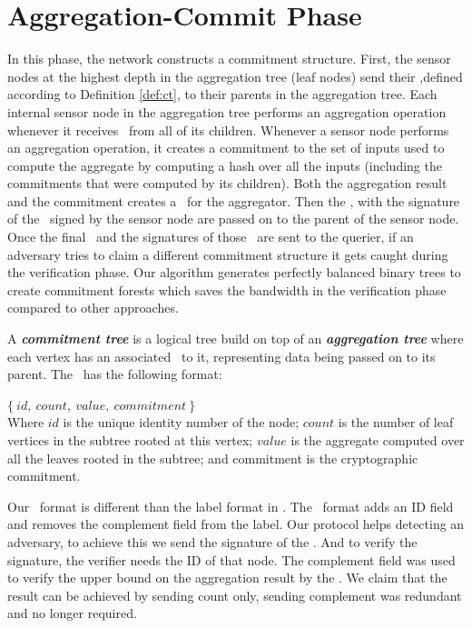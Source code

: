 \section{Aggregation-Commit Phase}
	In this phase, the network constructs a commitment structure. 
	First, the sensor nodes at the highest depth in the aggregation tree (leaf nodes) send their \payloads,defined according to Definition \ref{def:ct}, to their parents in the aggregation tree.
	Each internal sensor node in the aggregation tree performs an aggregation operation whenever it receives \payloads\  from all of its children.
	Whenever a sensor node performs an aggregation operation, it creates a commitment to the set of inputs used to compute the aggregate by computing a hash over all the inputs (including the commitments that were computed by its children). 
	Both the aggregation result and the commitment creates a \payload\ for the aggregator.
	Then the \payload, with the signature of the \payload\ signed by the sensor node are passed on to the parent of the sensor node.
	Once the final \payloads\  and the signatures of those \payloads\  are sent to the querier, if an adversary tries to claim a different commitment structure it gets caught during the verification phase.
	Our algorithm generates perfectly balanced binary trees to create commitment forests which saves the bandwidth in the verification phase compared to other approaches.

	\begin{definition}\cite{chan2006secure}\label{def:ct}
		A \textbf{\textit{commitment tree}} is a logical tree build on top of an \textbf{\textit{aggregation tree}} where each vertex has an associated \payload\ to it, representing data being passed on to its parent. The \payload\ has the following format:

		$\{\ id,\ count,\ value,\ commitment\ \}$\\
		Where $id$ is the unique identity number of the node; $count$ is the number of leaf vertices in the subtree rooted at this vertex; $value$ is the aggregate computed over all the leaves rooted in the subtree; and commitment is the cryptographic commitment.

	\end{definition}

	Our \payload\ format is different than the label format in \cite{chan2006secure}.
	The \payload\ format adds an ID field and removes the complement field from the label. 
	Our protocol helps detecting an adversary, to achieve this we send the signature of the \payload. 
	And to verify the signature, the verifier needs the ID of that node.
	The complement field was used to verify the upper bound on the aggregation result by the \q.
	We claim that the result can be achieved by sending count only, sending complement was redundant and no longer required.     

